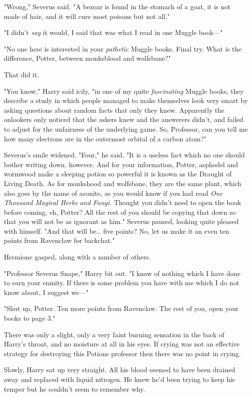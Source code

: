 "Wrong," Severus said. "A bezoar is found in the stomach of a goat, it is not 
made of hair, and it will cure most poisons but not all."

"I didn't \emph{say} it would, I said that was what I read in one Muggle 
book---"

"No one here is interested in your \emph{pathetic} Muggle books. Final try. 
What is the difference, Potter, between monksblood and wolfsbane?"

That did it.

"You know," Harry said icily, "in one of my quite \emph{fascinating} Muggle 
books, they describe a study in which people managed to make themselves look 
very smart by asking questions about random facts that only they knew. 
Apparently the onlookers only noticed that the askers knew and the answerers 
didn't, and failed to adjust for the unfairness of the underlying game. So, 
Professor, can you tell me how many electrons are in the outermost orbital of a 
carbon atom?"

Severus's smile widened. "Four," he said. "It is a useless fact which no one 
should bother writing down, however. And for your information, Potter, asphodel 
and wormwood make a sleeping potion so powerful it is known as the Draught of 
Living Death. As for monkshood and wolfsbane, they are the same plant, which 
also goes by the name of aconite, as you would know if you had read \emph{One 
Thousand Magical Herbs and Fungi.} Thought you didn't need to open the book 
before coming, eh, Potter? All the rest of you should be copying that down so 
that you will not be as ignorant as him." Severus paused, looking quite pleased 
with himself. "And that will be{\ldots} five points? No, let us make it an even 
ten points from Ravenclaw for backchat."

Hermione gasped, along with a number of others.

"Professor Severus Snape," Harry bit out. "I know of nothing which I have done 
to earn your enmity. If there is some problem you have with me which I do not 
know about, I suggest we---"

"Shut up, Potter. Ten more points from Ravenclaw. The rest of you, open your 
books to page 3."

There was only a slight, only a very faint burning sensation in the back of 
Harry's throat, and no moisture at all in his eyes. If crying was not an 
effective strategy for destroying this Potions professor then there was no 
point in crying.

Slowly, Harry sat up very straight. All his blood seemed to have been drained 
away and replaced with liquid nitrogen. He knew he'd been trying to keep his 
temper but he couldn't seem to remember why.

